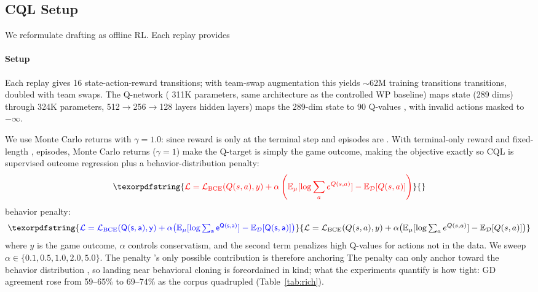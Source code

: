 \documentclass[journal]{IEEEtran}
\providecommand{\DIFaddtex}[1]{{\protect\color{blue} \sf #1}} %
\providecommand{\DIFdeltex}[1]{{\protect\color{red} \scriptsize #1}} %
\providecommand{\DIFaddbegin}{} %
\providecommand{\DIFaddend}{} %
\providecommand{\DIFdelbegin}{} %
\providecommand{\DIFdelend}{} %
\providecommand{\DIFadd}[1]{\texorpdfstring{\DIFaddtex{#1}}{#1}} %
\providecommand{\DIFdel}[1]{\texorpdfstring{\DIFdeltex{#1}}{}} %
\begin{document}
\DIFdelbegin \subsection{\DIFdel{CQL Setup}}
\addtocounter{subsection}{-1}%

\DIFdel{We reformulate drafting as offline RL. Each replay provides }\DIFdelend \DIFaddbegin \paragraph{\DIFadd{Setup}} \DIFadd{Each replay gives }\DIFaddend 16 \DIFdelbegin \DIFdel{state-action-reward transitions; with team-swap augmentation this yields $\sim$62M training transitions}\DIFdelend \DIFaddbegin \DIFadd{transitions, doubled with team swaps}\DIFaddend . The Q-network (\DIFdelbegin \DIFdel{311K parameters, same architecture as the controlled WP baseline) maps state (289 dims) through }\DIFdelend \DIFaddbegin \DIFadd{324K parameters, }\DIFaddend 512$\to$256$\to$128 \DIFdelbegin \DIFdel{layers }\DIFdelend \DIFaddbegin \DIFadd{hidden layers) maps the 289-dim state }\DIFaddend to 90 Q-values \DIFdelbegin \DIFdel{, }\DIFdelend with invalid actions masked\DIFdelbegin \DIFdel{to $-\infty$. }%

\DIFdel{We use Monte Carlo returns with $\gamma = 1.0$: since reward is only at the terminal step and episodes are }\DIFdelend \DIFaddbegin \DIFadd{. With terminal-only reward and }\DIFaddend fixed-length \DIFdelbegin \DIFdel{, }\DIFdelend \DIFaddbegin \DIFadd{episodes, Monte Carlo returns ($\gamma = 1$) make }\DIFaddend the Q-target \DIFdelbegin \DIFdel{is simply }\DIFdelend the game outcome, \DIFdelbegin \DIFdel{making the objective exactly }\DIFdelend \DIFaddbegin \DIFadd{so CQL is }\DIFaddend supervised outcome regression plus a \DIFdelbegin \DIFdel{behavior-distribution penalty:
}\begin{displaymath}
\DIFdel{\mathcal{L} = \mathcal{L}_\text{BCE}(Q(s,a), y) + \alpha \left( \mathbb{E}_\mu[\log \sum_a e^{Q(s,a)}] - \mathbb{E}_\mathcal{D}[Q(s,a)] \right)
}\end{displaymath}%
\DIFdelend \DIFaddbegin \DIFadd{behavior penalty:
}\begin{equation}
\DIFadd{\mathcal{L} = \mathcal{L}_\text{BCE}(Q(s,a), y) + \alpha \big( \mathbb{E}_\mu[\log \textstyle\sum_a e^{Q(s,a)}] - \mathbb{E}_\mathcal{D}[Q(s,a)] \big)
}\end{equation}\DIFaddend 
\DIFdelbegin \DIFdel{where $y$ is the game outcome, $\alpha$ controls conservatism, and the second term penalizes high Q-values for actions not in the data. We sweep $\alpha \in \{0.1, 0.5, 1.0, 2.0, 5.0\}$. The penalty 's only possible contribution is therefore anchoring }\DIFdelend \DIFaddbegin \DIFadd{The penalty can only anchor }\DIFaddend toward the behavior distribution\DIFdelbegin \DIFdel{, so landing near behavioral cloning is foreordained in kind; what the experiments quantify is how tight: GD agreement rose from 59--65\% to 69--74\% as the corpus quadrupled (Table~\ref{tab:rich}). }%
\end{document}
